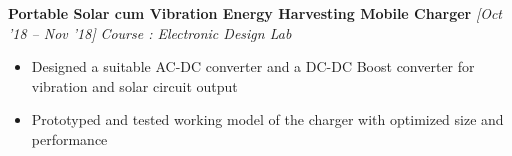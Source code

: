 \documentclass[10 pt]{article}%
\begin{document}
{{{{{\begin{itemize}[leftmargin=*]
	\end{itemize}
{\flushleft \textbf {\large{Portable Solar cum Vibration Energy Harvesting Mobile Charger}} \hfill {{{\em{[Oct '18 – Nov '18]}}}}
	\vspace{-0.8em}
	{\flushleft \em{Course : Electronic Design Lab}}
	\vspace{-5pt}
	\begin{itemize}[leftmargin=*]
		\setlength\itemsep{1.5pt}
		\setlength\parskip{1.5pt}
			\item Designed a suitable AC-DC converter and a DC-DC Boost converter for vibration and solar circuit output
			\item Prototyped and tested working model of the charger with optimized size and performance
		\end{itemize}


}}}}}}
\end{document}
